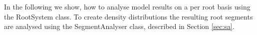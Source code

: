 
In the following we show, how to analyse model results on a per root basis using the RootSystem class. To create density distributions the resulting root segments are analysed using the SegmentAnalyser class, described in Section \ref{sec:sa}.






